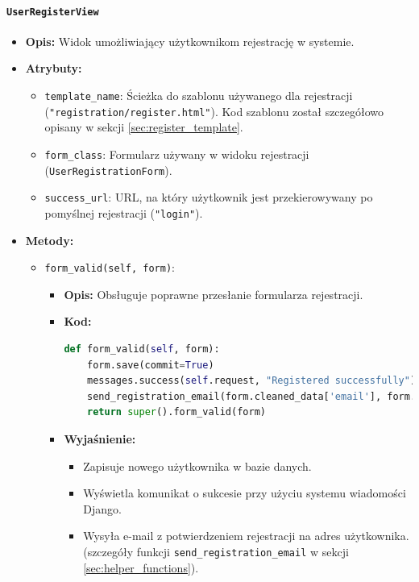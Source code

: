 \documentclass[12pt,a4paper,oneside]{article}
\theoremstyle{definition}
\numberwithin{equation}{section}
\begin{document}
\paragraph{\texttt{UserRegisterView}}
\begin{itemize}
    \item \textbf{Opis:} Widok umożliwiający użytkownikom rejestrację w systemie.
    \item \textbf{Atrybuty:}
    \begin{itemize}
        \item \texttt{template\_name}: Ścieżka do szablonu używanego dla rejestracji (\texttt{"registration/register.html"}). 
        Kod szablonu został szczegółowo opisany w sekcji \ref{sec:register_template}.
        \item \texttt{form\_class}: Formularz używany w widoku rejestracji (\texttt{UserRegistrationForm}).
        \item \texttt{success\_url}: URL, na który użytkownik jest przekierowywany po pomyślnej rejestracji (\texttt{"login"}).
    \end{itemize}
    \item \textbf{Metody:}
    \begin{itemize}
        \item \texttt{form\_valid(self, form)}:
        \begin{itemize}
            \item \textbf{Opis:} Obsługuje poprawne przesłanie formularza rejestracji.
            \item \textbf{Kod:}
            \begin{lstlisting}[language=Python, caption=Metoda form\_valid w UserRegisterView]
def form_valid(self, form):
    form.save(commit=True)
    messages.success(self.request, "Registered successfully")
    send_registration_email(form.cleaned_data['email'], form.cleaned_data['first_name'])
    return super().form_valid(form)
            \end{lstlisting}
            \item \textbf{Wyjaśnienie:}
            \begin{itemize}
                \item Zapisuje nowego użytkownika w bazie danych.
                \item Wyświetla komunikat o sukcesie przy użyciu systemu wiadomości Django.
                \item Wysyła e-mail z potwierdzeniem rejestracji na adres użytkownika.  (szczegóły funkcji \texttt{send\_registration\_email} w sekcji \ref{sec:helper_functions}).

\end{itemize}
\end{itemize}
\end{itemize}
\end{itemize}
\end{document}
